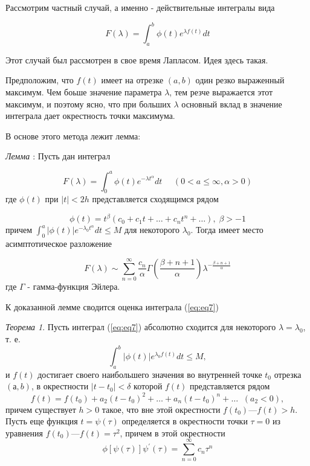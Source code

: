 \documentclass[14pt]{extarticle}
\begin{document}
Рассмотрим частный случай, а именно - действительные интегралы вида

\begin{equation}\label{eq:eq7}
F(\lambda) = \int_{a}^{b}\phi(t)e^{\lambda f(t)}dt
\end{equation} 

Этот случай был рассмотрен в свое время Лапласом. Идея здесь такая. 

Предположим, что $f(t)$ имеет на отрезке $(a, b)$ один резко выраженный максимум. Чем боьше значение параметра $\lambda$, тем резче выражается этот максимум, и поэтому ясно, что при больших $\lambda$ основный вклад в значение интеграла дает окрестность точки максимума. 

В основе этого метода лежит лемма:

\textit{Лемма \label{lemma:lemma1}}: Пусть дан интеграл

$$
F(\lambda) = \int_{0}^{a}\phi(t)e^{-\lambda t^\alpha}dt \:\:\:\:\:\: (0 < a \le \infty, \alpha>0)
$$
где $\phi(t)$ при $|t|<2h$ представляется сходящимся рядом

$$
\phi(t)=t^\beta(c_0+c_1 t+\dots+c_n t^n+\dots), \; \beta>-1
$$
причем $\int_{0}^{a}|\phi(t)| e^{-\lambda_0 t^\alpha}dt\le M$ для некоторого $\lambda_0$. Тогда имеет место асимптотическое разложение

\begin{equation}\label{eq:eq8}
F(\lambda) \sim \sum_{n=0}^{\infty}\frac{c_n}{\alpha} \Gamma\left(\frac{\beta + n + 1}{\alpha}\right)\lambda^{-\frac{\beta + n + 1}{\alpha}}
\end{equation} 
где $\Gamma$ - гамма-функция Эйлера.

К доказанной лемме сводится оценка интеграла (\ref{eq:eq7})

\textit{Теорема 1\label{th:th1}}. Пусть интеграл (\ref{eq:eq7}) абсолютно сходится для некоторого $\lambda = \lambda_0$, т. е.
$$
\int_{a}^{b} |\phi(t)|e^{\lambda_0 f(t)}dt \le M,
$$
и $f(t)$ достигает своего наибольшего значения во внутренней точке $t_0$ отрезка $(а, b)$, в окрестности $| t - t_0| < \delta$ которой $f(t)$ представляется рядом
$$
f(t)=f(t_0) + a_2(t-t_0)^2+\dots+a_n(t-t_0)^n+\dots \;\; (a_2<0),
$$
причем существует $h > 0$ такое, что вне этой окрестности $f (t_0) — f(t) > h$. Пусть еще функция $t = \psi(\tau)$ определяется в окрестности точки $\tau = 0$ из уравнения $f(t_0) — f(t) = \tau^2$, причем в этой окрестности
\begin{equation}\label{eq:eq9}
\phi[\psi(\tau)]\psi^\prime(\tau) = \sum_{n=0}^{\infty} c_n\tau^n
\end{equation}
\end{document}
